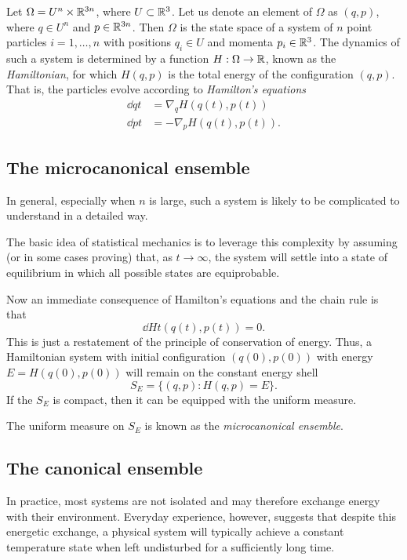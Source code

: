 Let $\Omega = U^n \times {\mathbb R}^{3n}$, where $U \subset {\mathbb R}^3$. Let us denote an element of
$\Omega$ as $(q, p)$, where $q \in U^n$ and $p \in {\mathbb R}^{3n}$. Then $\Omega$ is the state
space of a system of $n$ point particles $i = 1, \ldots, n$ with positions $q_i \in U$
and momenta $p_i \in {\mathbb R}^3$. The dynamics of such a system is determined by a function
$H : \Omega \rightarrow {\mathbb R}$, known as the \emph{Hamiltonian}, for which $H(q, p)$ is the total
energy of the configuration $(q, p)$. That is, the particles evolve according to
\emph{Hamilton's equations}
\begin{align}
\dd{q}{t} &= \nabla_q H(q(t), p(t)) \\
\dd{p}{t} &= -\nabla_p H(q(t), p(t)).
\end{align}


\subsection{The microcanonical ensemble}

In general, especially when $n$ is large, such a system is likely to be complicated
to understand in a detailed way.

The basic idea of statistical mechanics is to leverage this complexity by assuming
(or in some cases proving) that, as $t\to\infty$, the system will settle into a
state of equilibrium in which all possible states are equiprobable.

Now an immediate consequence of Hamilton's equations and the chain rule is that
\begin{equation}
\dd{H}{t}(q(t), p(t)) = 0.
\end{equation}
This is just a restatement of the principle of conservation of energy. Thus, a
Hamiltonian system with initial configuration $(q(0), p(0))$ with energy
$E = H(q(0), p(0))$ will remain on the constant energy shell
\begin{equation}
S_E = \{ (q, p) : H(q, p) = E \}.
\end{equation}
If the $S_E$ is compact, then it can be equipped with the uniform measure.

The uniform measure on $S_E$ is known as the \emph{microcanonical ensemble}.


\subsection{The canonical ensemble}

In practice, most systems are not isolated and may therefore exchange energy with
their environment. Everyday experience, however, suggests that despite this energetic
exchange, a physical system will typically achieve a constant temperature state when
left undisturbed for a sufficiently long time.

